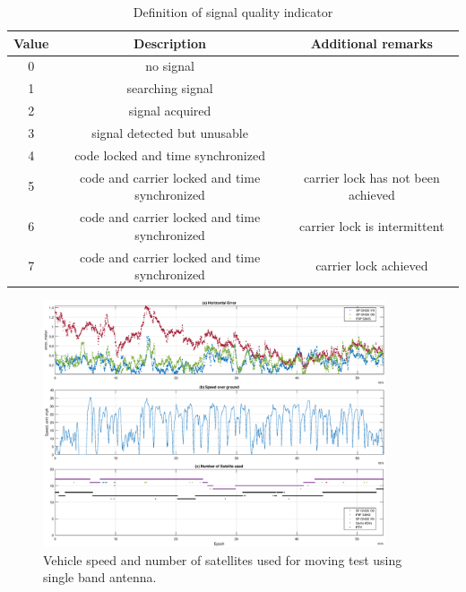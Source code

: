 \documentclass[letterpaper, 10 pt,onecolumn]{article}
\begin{document}
	\begin{table}[H]
		\centering
		\begin{tabular}{|c|c|c|}
			\hline
			Value & Description                                   & Additional remarks                 \\ \hline
			0     & no signal                                     &                                    \\ \hline
			1     & searching signal                              &                                    \\ \hline
			2     & signal acquired                               &                                    \\ \hline
			3     & signal detected but unusable                  &                                    \\ \hline
			4     & code locked and time synchronized             &                                    \\ \hline
			5     & code and carrier locked and time synchronized & carrier lock has not been achieved \\ \hline
			6     & code and carrier locked and time synchronized & carrier lock is intermittent       \\ \hline
			7     & code and carrier locked and time synchronized & carrier lock achieved              \\ \hline
		\end{tabular}
		\label{tab:qi}
		\caption{Definition of signal quality indicator}
	\end{table}
	
	\begin{figure}[H]
		\centering
		\includegraphics[width=0.9\textwidth]{figures/dynamicinfo_single.eps}
		\caption{Vehicle speed and number of satellites used for moving test using single band antenna.}
		\label{fig:m1vspeed}
	\end{figure}
\end{document}

